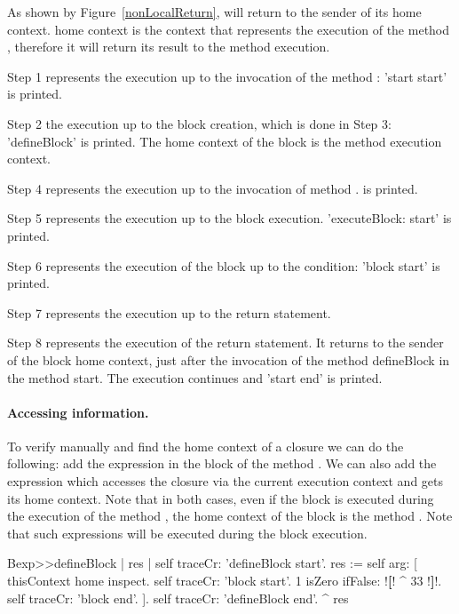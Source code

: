 \documentclass[a4paper,10pt,twoside]{book}
\begin{document}
As shown by Figure~\ref{nonLocalReturn}, \ct{[^33]} will return to the sender of its home context. \ct{[^33]} home context is the context that represents the execution of the method , therefore it will return its result to the method  execution.

Step 1 represents the execution up to the invocation of the method : 'start start' is printed.

Step 2 the execution up to the block creation, which is done in Step 3: 'defineBlock' is printed. The home context of the block is the  method execution context.

Step 4 represents the execution up to the invocation of method .  is printed.

Step 5 represents the execution up to the block execution. 'executeBlock: start' is printed.

Step 6 represents the execution of the block up to the condition: 'block start' is printed.

Step 7 represents the execution up to the return statement.

Step 8 represents the execution of the return statement. It returns to the sender of the block home context, \ie just after the invocation of the method defineBlock in the method start. The execution continues and 'start end' is printed.




\paragraph{Accessing information.}
To verify manually and find the home context of a closure we can do the following: add the expression  in the block of the  method . We can also add the expression  which accesses the closure via the current execution context and gets its home context. Note that in both cases, even if the block is executed during the execution of the method , the home context of the block is the method .
Note that such expressions will be executed during the block execution.

\begin{code}{}
Bexp>>defineBlock
	| res |
	self traceCr: 'defineBlock start'.
	res := self arg: [ thisContext home inspect. self traceCr: 'block start'.
                            1 isZero ifFalse: !\textbf{[}! ^ 33 !\textbf{]}!.
                            self traceCr: 'block end'. ].
	self traceCr: 'defineBlock end'.
	^ res
\end{code}
\end{document}
